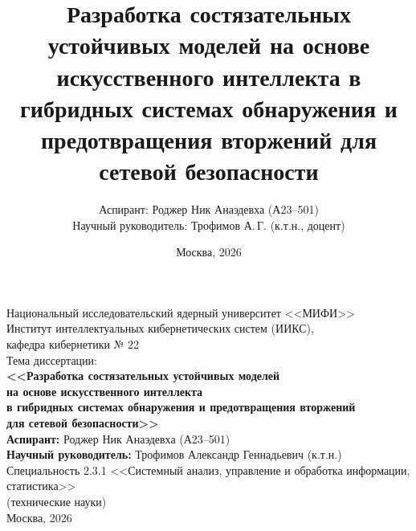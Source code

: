 \documentclass[10pt,aspectratio=169]{beamer}
\title{Разработка состязательных устойчивых моделей на основе
искусственного интеллекта в гибридных системах обнаружения и
предотвращения вторжений для сетевой безопасности}
\author{Аспирант: Роджер Ник Анаэдевха (А23--501)\\
Научный руководитель: Трофимов А.\,Г. (к.т.н., доцент)}
\institute{ИИКС, кафедра кибернетики № 22, НИЯУ МИФИ}
\date{Москва, 2026}
\begin{document}
{
\begin{frame}[plain]
\begin{center}
\vspace{0.3cm}
{\small Национальный исследовательский ядерный университет <<МИФИ>>}\\[2pt]
{\small Институт интеллектуальных кибернетических систем (ИИКС),\\
кафедра кибернетики № 22}\\[12pt]
{\small Тема диссертации:}\\[6pt]
{\color{navy}\bfseries\large
<<Разработка состязательных устойчивых моделей\\
на основе искусственного интеллекта\\
в гибридных системах обнаружения и предотвращения вторжений\\
для сетевой безопасности>>}\\[14pt]
\textbf{Аспирант:} Роджер Ник Анаэдевха (А23--501)\\
\textbf{Научный руководитель:} Трофимов Александр Геннадьевич
(к.т.н.)\\[8pt]
{\small Специальность 2.3.1 <<Системный анализ, управление
и обработка информации, статистика>>\\
(технические науки)}\\[14pt]
{\small Москва, 2026}
\end{center}
\end{frame}}
\end{document}
